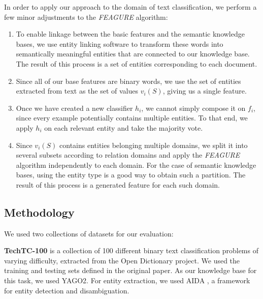 \documentclass[twoside,11pt]{article}
\theoremstyle{definition}
\begin{document}
In order to apply our approach to the domain of text classification, we perform a few minor adjustments to the \emph{FEAGURE} algorithm:
\begin{enumerate}
	\item To enable linkage between the basic features and the semantic knowledge bases, we use entity linking software  to transform these words into semantically meaningful entities that are connected to our knowledge base. The result of this process is a set of entities corresponding to each document.
	\item Since all of our base features are binary words, we use the set of entities extracted from text as the set of values $v_i(S)$, giving us a single feature.
	\item Once we have created a new classifier $h_i$, we cannot simply compose it on $f_i$, since every example potentially contains multiple entities. To that end, we apply $h_i$ on each relevant entity and take the majority vote.
	\item Since $v_i(S)$ contains entities belonging multiple domains,  we split it into several subsets according to relation domains and apply the \emph{FEAGURE} algorithm independently to each domain. For the case of semantic knowledge bases, using the entity type is a good way to obtain such a partition. The result of this process is a generated feature for each such domain.
\end{enumerate}

\subsection{Methodology}

We used two collections of datasets for our evaluation:

\textbf{TechTC-100} \cite{gabrilovich2004text} is a collection of 100 different binary text classification problems of varying difficulty, extracted from the Open Dictionary project.
We used the training and testing sets defined in the original paper. 
As our knowledge base for this task, we used YAGO2.%
For entity extraction, we used AIDA \cite{hoffart2011robust}, a framework for entity detection and disambiguation. 

\end{document}
